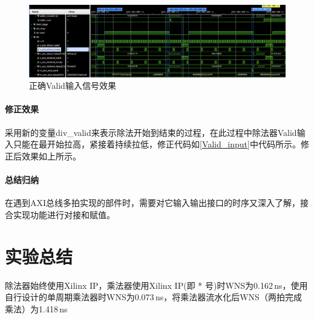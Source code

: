 \documentclass[UTF-8,twoside,c5size]{ctexart}
\begin{document}
	\begin{figure}[h]
		\centering
		\includegraphics[width=1\linewidth]{pictures/valid_correct.png}
		\caption[Valid\_correct]{正确Valid输入信号效果}
		\label{fig:validcorrect}
	\end{figure}

	\paragraph{修正效果}\hfill
	
	采用新的变量div\_valid来表示除法开始到结束的过程，在此过程中除法器Valid输入只能在最开始拉高，紧接着持续拉低，修正代码如\ref{Valid_input}中代码所示。修正后效果如上所示。
	
	\paragraph{总结归纳}\hfill
	
	在遇到AXI总线多拍实现的部件时，需要对它输入输出接口的时序又深入了解，接合实现功能进行对接和赋值。
	
	\section{实验总结}
	
	除法器始终使用Xilinx IP，乘法器使用Xilinx IP(即 * 号)时WNS为0.162\,ns，使用自行设计的单周期乘法器时WNS为0.073\,ns，将乘法器流水化后WNS（两拍完成乘法）为1.418\,ns
	
\end{document}
